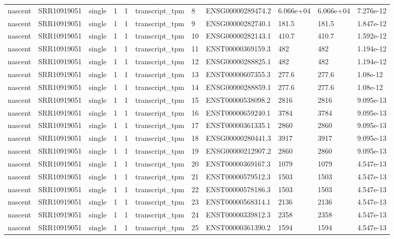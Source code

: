 \begin{tabular}{lllllllllll}
nascent & SRR10919051 & single & 1 & 1 & transcript\_tpm & 8 & ENSG00000289474.2 & 6.066e+04 & 6.066e+04 & 7.276e-12 \\
nascent & SRR10919051 & single & 1 & 1 & transcript\_tpm & 9 & ENSG00000282740.1 & 181.5 & 181.5 & 1.847e-12 \\
nascent & SRR10919051 & single & 1 & 1 & transcript\_tpm & 10 & ENSG00000282143.1 & 410.7 & 410.7 & 1.592e-12 \\
nascent & SRR10919051 & single & 1 & 1 & transcript\_tpm & 11 & ENST00000369159.3 & 482 & 482 & 1.194e-12 \\
nascent & SRR10919051 & single & 1 & 1 & transcript\_tpm & 12 & ENSG00000288825.1 & 482 & 482 & 1.194e-12 \\
nascent & SRR10919051 & single & 1 & 1 & transcript\_tpm & 13 & ENST00000607355.3 & 277.6 & 277.6 & 1.08e-12 \\
nascent & SRR10919051 & single & 1 & 1 & transcript\_tpm & 14 & ENSG00000288859.1 & 277.6 & 277.6 & 1.08e-12 \\
nascent & SRR10919051 & single & 1 & 1 & transcript\_tpm & 15 & ENST00000538098.2 & 2816 & 2816 & 9.095e-13 \\
nascent & SRR10919051 & single & 1 & 1 & transcript\_tpm & 16 & ENST00000659240.1 & 3784 & 3784 & 9.095e-13 \\
nascent & SRR10919051 & single & 1 & 1 & transcript\_tpm & 17 & ENST00000361335.1 & 2860 & 2860 & 9.095e-13 \\
nascent & SRR10919051 & single & 1 & 1 & transcript\_tpm & 18 & ENSG00000280441.3 & 3917 & 3917 & 9.095e-13 \\
nascent & SRR10919051 & single & 1 & 1 & transcript\_tpm & 19 & ENSG00000212907.2 & 2860 & 2860 & 9.095e-13 \\
nascent & SRR10919051 & single & 1 & 1 & transcript\_tpm & 20 & ENST00000369167.3 & 1079 & 1079 & 4.547e-13 \\
nascent & SRR10919051 & single & 1 & 1 & transcript\_tpm & 21 & ENST00000579512.3 & 1503 & 1503 & 4.547e-13 \\
nascent & SRR10919051 & single & 1 & 1 & transcript\_tpm & 22 & ENST00000578186.3 & 1503 & 1503 & 4.547e-13 \\
nascent & SRR10919051 & single & 1 & 1 & transcript\_tpm & 23 & ENST00000568314.1 & 2136 & 2136 & 4.547e-13 \\
nascent & SRR10919051 & single & 1 & 1 & transcript\_tpm & 24 & ENST00000339812.3 & 2358 & 2358 & 4.547e-13 \\
nascent & SRR10919051 & single & 1 & 1 & transcript\_tpm & 25 & ENST00000361390.2 & 1594 & 1594 & 4.547e-13 \\

\end{tabular}
